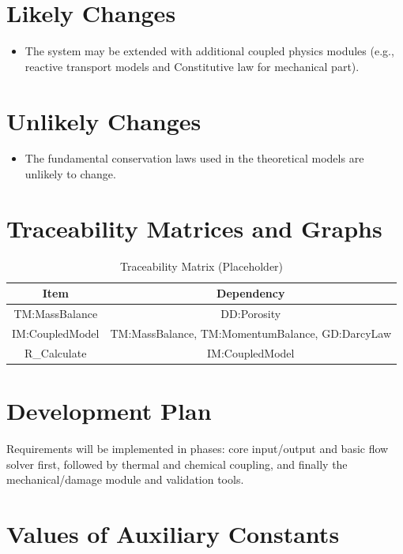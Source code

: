 \documentclass[12pt]{article}
\newcounter{lcnum} %
\begin{document}
\section{Likely Changes}

\begin{itemize}
\item[LC\refstepcounter{lcnum}\thelcnum\label{LC_Modules}:]
The system may be extended with additional coupled physics modules (e.g., reactive transport models and Constitutive law for mechanical part).
\end{itemize}

\section{Unlikely Changes}

\begin{itemize}
\item[LC\refstepcounter{lcnum}\thelcnum\label{LC_Fundamental}:]
The fundamental conservation laws used in the theoretical models are unlikely to change.
\end{itemize}

\section{Traceability Matrices and Graphs}

\begin{table}[H]
\caption{Traceability Matrix (Placeholder)}
\label{Table:trace}
\centering
\begin{tabular}{|c|c|}
\hline
Item & Dependency \\
\hline
TM:MassBalance & DD:Porosity \\
IM:CoupledModel & TM:MassBalance, TM:MomentumBalance, GD:DarcyLaw \\
R\_Calculate & IM:CoupledModel \\
\hline
\end{tabular}
\end{table}

\section{Development Plan}

Requirements will be implemented in phases: core input/output and basic flow solver first, followed by thermal and chemical coupling, and finally the mechanical/damage module and validation tools.

\section{Values of Auxiliary Constants}
\end{document}
